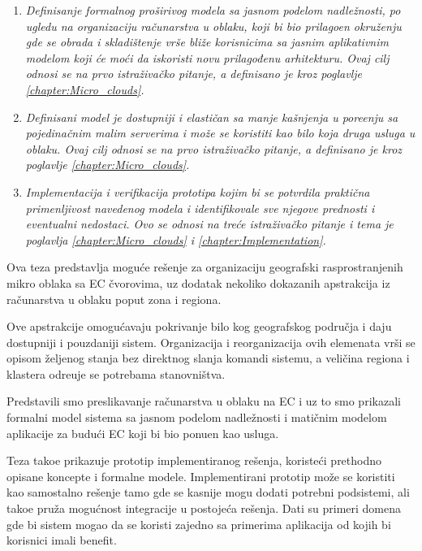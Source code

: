 \begin{enumerate}[start=1,label={(\bfseries \arabic*)}]
	\item \textit{Definisanje formalnog pro\v sirivog modela sa jasnom podelom nadle\v znosti, po ugledu na organizaciju ra\v cunarstva u oblaku, koji bi bio prilago\dj en okru\v zenju gde se obrada i skladištenje vr\v se bli\v ze korisnicima sa jasnim aplikativnim modelom koji će mo\'ci da iskoristi novu prilagođenu arhitekturu. Ovaj cilj odnosi se na prvo istra\v ziva\v cko pitanje, a definisano je kroz poglavlje \ref{chapter:Micro_clouds}.}
	\item \textit{Definisani model je dostupniji i elasti\v can sa manje ka\v snjenja u pore\dj enju sa pojedina\v cnim malim serverima i mo\v ze se koristiti kao bilo koja druga usluga u oblaku. Ovaj cilj odnosi se na prvo istra\v ziva\v cko pitanje, a definisano je kroz poglavlje \ref{chapter:Micro_clouds}.}
	\item \textit{Implementacija i verifikacija prototipa kojim bi se potvrdila prakti\v cna primenljivost navedenog modela i identifikovale sve njegove prednosti i eventualni nedostaci. Ovo se odnosi na tre\'ce istra\v ziva\v cko pitanje i tema je poglavlja \ref{chapter:Micro_clouds} i \ref{chapter:Implementation}.}
\end{enumerate}

\noindent
Ova teza predstavlja mogu\'ce re\v senje za organizaciju geografski rasprostranjenih mikro oblaka sa EC \v cvorovima, uz dodatak nekoliko dokazanih apstrakcija iz ra\v cunarstva u oblaku poput zona i regiona.

Ove apstrakcije omogu\'cavaju pokrivanje bilo kog geografskog podru\v cja i daju dostupniji i pouzdaniji sistem. Organizacija i reorganizacija ovih elemenata vr\v si se opisom \v zeljenog stanja bez direktnog slanja komandi sistemu, a veli\v cina regiona i klastera odre\dj uje se potrebama stanovni\v stva.

Predstavili smo preslikavanje ra\v cunarstva u oblaku na EC i uz to smo prikazali formalni model sistema sa jasnom podelom nadle\v znosti i mati\v cnim modelom aplikacije za budu\'ci EC koji bi bio ponu\dj en kao usluga. 

Teza tako\dj e prikazuje prototip implementiranog re\v senja, koriste\'ci prethodno opisane koncepte i formalne modele. Implementirani prototip mo\v ze se koristiti kao samostalno re\v senje tamo gde se kasnije mogu dodati potrebni podsistemi, ali tako\dj e pru\v za mogu\'cnost integracije u postoje\'ca re\v senja. Dati su primeri domena gde bi sistem mogao da se koristi zajedno sa primerima aplikacija od kojih bi korisnici imali benefit. 

